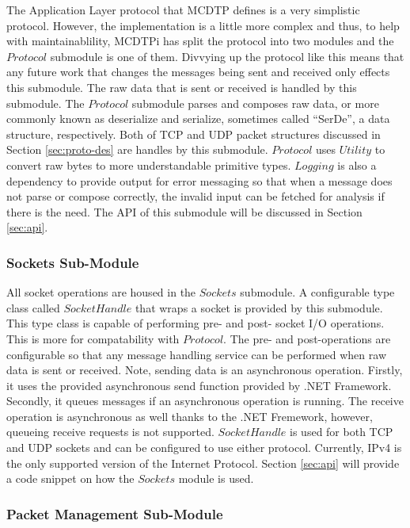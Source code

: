 The Application Layer protocol that MCDTP defines is a very simplistic protocol. However, the implementation is a little more complex and thus, to help with maintainablility, MCDTPi has split the protocol into two modules and the $Protocol$ submodule is one of them. Divvying up the protocol like this means that any future work that changes the messages being sent and received only effects this submodule. The raw data that is sent or received is handled by this submodule. The $Protocol$ submodule parses and composes raw data, or more commonly known as deserialize and serialize, sometimes called ``SerDe'', a data structure, respectively. Both of TCP and UDP packet structures discussed in Section \ref{sec:proto-des} are handles by this submodule. $Protocol$ uses $Utility$ to convert raw bytes to more understandable primitive types. $Logging$ is also a dependency to provide output for error messaging so that when a message does not parse or compose correctly, the invalid input can be fetched for analysis if there is the need. The API of this submodule will be discussed in Section \ref{sec:api}.

\subsubsection{Sockets Sub-Module}

All socket operations are housed in the $Sockets$ submodule. A configurable type class called $SocketHandle$ that wraps a socket is provided by this submodule. This type class is capable of performing pre- and post- socket I/O operations. This is more for compatability with $Protocol$. The pre- and post-operations are configurable so that any message handling service can be performed when raw data is sent or received. Note, sending data is an asynchronous operation. Firstly, it uses the provided asynchronous send function provided by .NET Framework. Secondly, it queues messages if an asynchronous operation is running. The receive operation is asynchronous as well thanks to the .NET Fremework, however, queueing receive requests is not supported. $SocketHandle$ is used for both TCP and UDP sockets and can be configured to use either protocol. Currently, IPv4 is the only supported version of the Internet Protocol. Section \ref{sec:api} will provide a code snippet on how the $Sockets$ module is used.

\subsubsection{Packet Management Sub-Module}\label{sec:pm-sm}

